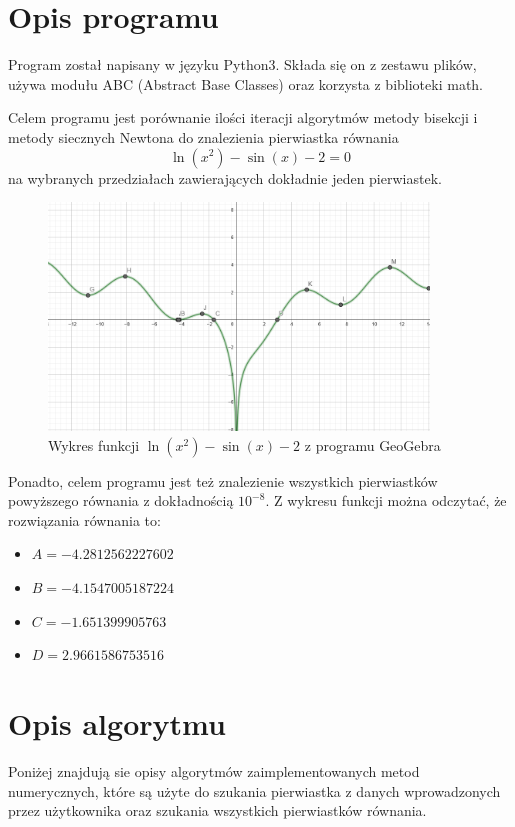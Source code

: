 \documentclass[12pt]{article}
\begin{document}
\section{Opis programu}
Program został napisany w języku Python3. Składa się on z zestawu plików, używa modułu ABC (Abstract Base Classes) oraz korzysta z biblioteki math.

Celem programu jest porównanie ilości iteracji algorytmów metody bisekcji i metody siecznych Newtona do znalezienia pierwiastka równania $$\ln(x^2) - \sin(x) - 2 = 0$$ na wybranych przedziałach zawierających dokładnie jeden pierwiastek.
\begin{figure}[H]
  \centering
  \includegraphics[width=0.9\textwidth]{Firefox_Screenshot_2023-04-28T10-41-17.086Z.png}
  \caption{Wykres funkcji $\ln(x^2) - \sin(x) - 2$ z programu GeoGebra}
  \label{fig:zdjecie1}
\end{figure}
Ponadto, celem programu jest też znalezienie wszystkich pierwiastków powyższego równania z dokładnością $10^{-8}$.
Z wykresu funkcji można odczytać, że rozwiązania równania to:

\begin{itemize}
    \item $A=-4.2812562227602$
    \item $B=-4.1547005187224$
    \item $C=-1.651399905763$
    \item $D=2.9661586753516$
\end{itemize}

\section{Opis algorytmu}
Poniżej znajdują sie opisy algorytmów zaimplementowanych metod numerycznych, które są użyte do szukania pierwiastka z danych wprowadzonych przez użytkownika oraz szukania wszystkich pierwiastków równania.
\end{document}
